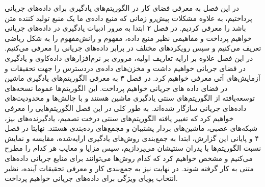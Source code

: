 در این فصل به معرفی فضای کار در الگوریتم‌های یادگیری برای داده‌های جریانی پرداختیم، به علاوه مشکلات پیش‌رو زمانی که منبع داده‌ی ما یک منبع تولید کننده متن باشد را معرفی کردیم. در فصل‌ ۲ ابتدا به مرور ادبیات یادگیری در داده‌های جریانی خواهیم پرداخت و مفاهیمی نظیر منبع داده‌، مفهوم و رانش‌مفهوم را به شکل ریاضی تعریف می‌کنیم و سپس رویکردهای مختلف در برابر داده‌های جریانی را معرفی می‌کنیم. در این فصل علاوه بر ارایه تعاریف اولیه، مروری بر نرم‌افزارهای داده‌کاوی و یادگیری در فضای جریانی خواهیم داشت و مخزن‌های داده‌ی دردسترس را جهت تحقیقات و آزمایش‌های آتی معرفی خواهیم کرد. در فصل ۳ به معرفی الگوریتم‌های یادگیری ماشین در فضای داده های جریانی خواهیم پرداخت. این الگوریتم‌ها عموما نسخه‌های توسعه‌یافته از الگوریتم‌های سنتی یادگیری ماشین‌ هستند و با چالش‌ها و محدودیت‌های داده‌های جریانی سازگار شده‌اند. به طور کلی در این فصل الگوریتم‌هایی را معرفی خواهیم کرد که تغییر یافته الگوریتم‌های سنتی درخت تصمیم، یادگیرنده‌های بیز، شبکه‌های عصبی، ماشین‌های بردار پشتیبان و مجمع‌های رده‌بندی هستند. نهایتا در فصل ۴ و پایانی این گزارش، ابتدا به جمع‌بندی روش‌های یادگیری ارایه‌شده، مقایسه و نمایش نسبت الگوریتم‌ها با پدران سنتیشان می‌پردازیم، سپس مزایا و معایب هر کدام را مطرح می‌کنیم و مشخص خواهیم کرد که کدام روش‌ها می‌توانند برای منابع جریانی داده‌های متنی به کار گرفته شوند. در نهایت نیز به جمع‌بندی کار و معرفی تحقیقات آینده،‌ نظیر انتخاب پویای ویژگی برای داده‌های جریانی خواهیم پرداخت.
